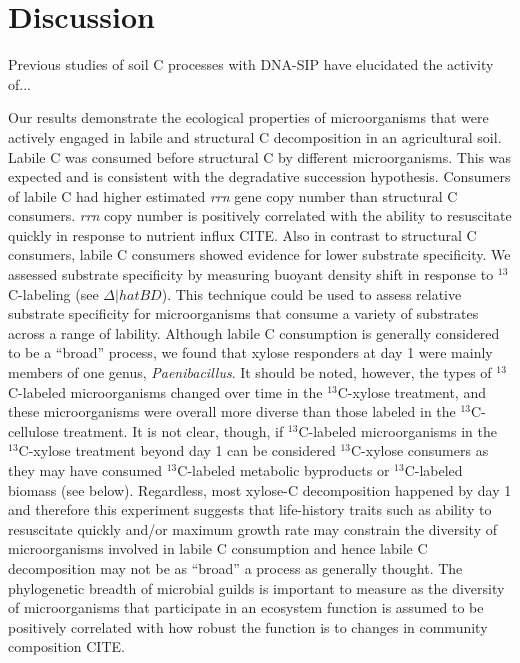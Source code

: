 \section{Discussion} 
Previous studies of soil C processes with DNA-SIP have elucidated the activity
of...

Our results demonstrate the ecological properties of microorganisms that were
actively engaged in labile and structural C decomposition in an agricultural
soil. Labile C was consumed before structural C by different microorganisms.
This was expected and is consistent with the degradative succession hypothesis.
Consumers of labile C had higher estimated \textit{rrn} gene copy number than
structural C consumers. \textit{rrn} copy number is positively correlated with
the ability to resuscitate quickly in response to nutrient influx CITE. Also in
contrast to structural C consumers, labile C consumers showed evidence for lower
substrate specificity. We assessed substrate specificity by measuring buoyant
density shift in response to $^{13}$C-labeling (see $\Delta|hat{BD}$). This
technique could be used to  assess relative substrate specificity for
microorganisms that consume a variety of substrates across a range of lability.
Although labile C consumption is generally considered to be a ``broad''
process, we found that xylose responders at day 1 were mainly members of one
genus, \textit{Paenibacillus}.  It should be noted, however, the types of
$^{13}$C-labeled microorganisms changed over time in the $^{13}$C-xylose
treatment, and these microorganisms were overall more diverse than those
labeled in the $^{13}$C-cellulose treatment. It is not clear, though,  if
$^{13}$C-labeled microorganisms in the $^{13}$C-xylose treatment beyond day 1
can be considered $^{13}$C-xylose consumers as they may have consumed $^{13}$C-labeled
metabolic byproducts or $^{13}$C-labeled biomass (see below). Regardless, most
xylose-C decomposition happened by day 1 and therefore this experiment suggests
that life-history traits such as ability to resuscitate quickly and/or maximum
growth rate may constrain the diversity of microorganisms involved in labile C
consumption and hence labile C decomposition may not be as ``broad'' a process
as generally thought. The phylogenetic breadth of microbial guilds is important
to measure as the diversity of microorganisms that participate in an ecosystem
function is assumed to be positively correlated with how robust the function is
to changes in community composition CITE.

